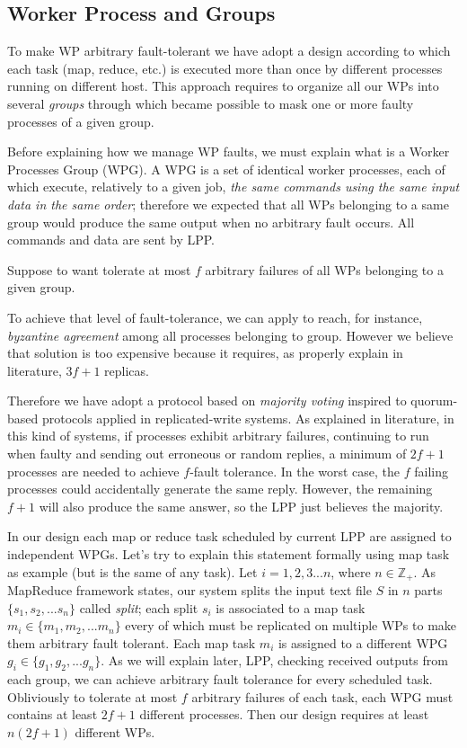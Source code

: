 \documentclass[sigchi]{acmart}
\begin{document}
\subsection{Worker Process and Groups}

To make WP arbitrary fault-tolerant we have adopt a design according to which each task (map, reduce, etc.) is executed more than once by different processes running on different host. This approach requires to organize all our WPs into several \textit{groups} through which became possible to mask one or more faulty processes of a given group. 

Before explaining how we manage WP faults, we must explain what is a Worker Processes Group (WPG). A WPG is a set of identical worker processes, each of which execute, relatively to a given job, \textit{the same commands using the same input data in the same order}; therefore we expected that all WPs belonging to a same group would produce the same output when no arbitrary fault occurs. All commands and data are sent by LPP.

Suppose to want tolerate at most $f$ arbitrary failures of all WPs belonging to a given group. 

To achieve that level of fault-tolerance, we can apply to reach, for instance, \textit{byzantine agreement} among all processes belonging to group. However we believe that solution is too expensive because it requires, as properly explain in literature\citep{SDCC}, $3f + 1$ replicas.

Therefore we have adopt a protocol based on \textit{majority voting} inspired to quorum-based protocols applied in replicated-write systems. As explained in literature\citep{SDCC}, in this kind of systems, if processes exhibit arbitrary failures, continuing to run when faulty and sending out erroneous or random replies, a minimum of $2f+1$ processes are needed to achieve $f$-fault tolerance. In the worst case, the $f$ failing processes could accidentally generate the same reply. However, the remaining $f+1$ will also produce the same answer, so the LPP just believes the majority.

In our design each map or reduce task scheduled by current LPP are assigned to independent WPGs. Let's try to explain this statement formally using map task as example (but is the same of any task). Let $i = 1,2,3...n$, where $n \in \mathbb{Z}_+$. As MapReduce framework states, our system splits the input text file $S$ in $n$ parts $\lbrace s_1, s_2, ... s_n \rbrace$ called \textit{split}; each split $s_i$ is associated to a map task $m_i \in \lbrace m_1, m_2, ... m_n \rbrace$ every of which must be replicated on multiple WPs to make them arbitrary fault tolerant. Each map task $m_i$ is assigned to a different WPG $g_i \in \lbrace g_1, g_2, ... g_n \rbrace$. As we will explain later, LPP, checking received outputs from each group, we can achieve arbitrary fault tolerance for every scheduled task. Obliviously to tolerate at most $f$ arbitrary failures of each task, each WPG must contains at least $2f+1$ different processes. Then our design requires at least $n(2f+1)$ different WPs.
\end{document}
